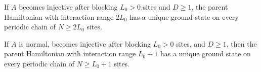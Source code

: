 \begin{theorem}%
    \label{thm:unique_gs_injective}
    \leanok
    If $A$ becomes injective after blocking $L_0 > 0$ sites and $D \ge 1$,
    the parent Hamiltonian with interaction range $2L_0$ has a unique ground
    state on every periodic chain of $N \ge 2L_0$ sites.
\end{theorem}

\begin{theorem}%
    \label{thm:unique_gs_normal}
    \leanok
    If $A$ is normal, becomes injective after blocking $L_0 > 0$ sites, and
    $D \ge 1$, then the parent Hamiltonian with interaction range $L_0 + 1$
    has a unique ground state on every periodic chain of $N \ge L_0+1$ sites.
\end{theorem}

